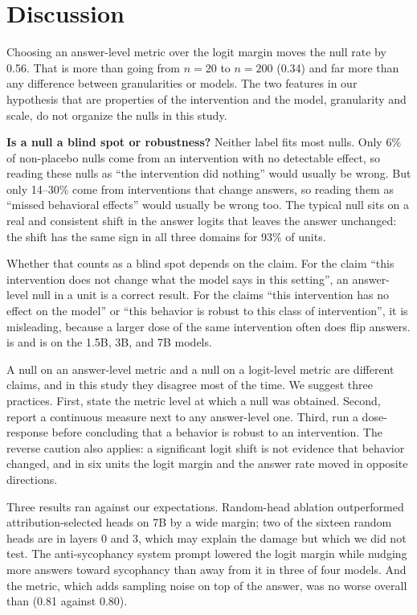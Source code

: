 \section{Discussion}
\label{sec:discussion}

Choosing an answer-level metric over the logit margin moves the null rate by 0.56.
That is more than going from $n = 20$ to $n = 200$ (0.34) and far more than any difference between granularities or models.
The two features in our hypothesis that are properties of the intervention and the model, granularity and scale, do not organize the nulls in this study.

{\bf Is a null a blind spot or robustness?}
Neither label fits most nulls.
Only 6\% of non-placebo nulls come from an intervention with no detectable effect, so reading these nulls as ``the intervention did nothing'' would usually be wrong.
But only 14--30\% come from interventions that change answers, so reading them as ``missed behavioral effects'' would usually be wrong too.
The typical null sits on a real and consistent shift in the answer logits that leaves the answer unchanged: the shift has the same sign in all three domains for 93\% of \latent units.

Whether that counts as a blind spot depends on the claim.
For the claim ``this intervention does not change what the model says in this setting'', an answer-level null in a \latent unit is a correct result.
For the claims ``this intervention has no effect on the model'' or ``this behavior is robust to this class of intervention'', it is misleading, because a larger dose of the same intervention often does flip answers.
 is \latent and  is \behav on the 1.5B, 3B, and 7B models.

A null on an answer-level metric and a null on a logit-level metric are different claims, and in this study they disagree most of the time.
We suggest three practices.
First, state the metric level at which a null was obtained.
Second, report a continuous measure next to any answer-level one.
Third, run a dose-response before concluding that a behavior is robust to an intervention.
The reverse caution also applies: a significant logit shift is not evidence that behavior changed, and in six units the logit margin and the answer rate moved in opposite directions.

Three results ran against our expectations.
Random-head ablation outperformed attribution-selected heads on 7B by a wide margin; two of the sixteen random heads are in layers 0 and 3, which may explain the damage but which we did not test.
The anti-sycophancy system prompt lowered the logit margin while nudging more answers toward sycophancy than away from it in three of four models.
And the \msample metric, which adds sampling noise on top of the answer, was no worse overall than \mgreedy (0.81 against 0.80).

